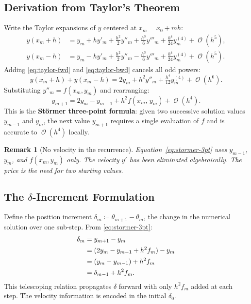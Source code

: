 \documentclass[11pt]{article}
\newtheorem{remark}{Remark}
\DeclareMathOperator{\OO}{\mathcal{O}}
\begin{document}
\subsection{Derivation from Taylor's Theorem}

Write the Taylor expansions of $y$ centered at $x_m = x_0 + mh$:
\begin{align}
  y(x_m + h) &= y_m + h y'_m + \tfrac{h^2}{2} y''_m
                + \tfrac{h^3}{6} y'''_m
                + \tfrac{h^4}{24} y^{(4)}_m + \OO(h^5), \label{eq:taylor-fwd}\\
  y(x_m - h) &= y_m - h y'_m + \tfrac{h^2}{2} y''_m
                - \tfrac{h^3}{6} y'''_m
                + \tfrac{h^4}{24} y^{(4)}_m + \OO(h^5). \label{eq:taylor-bwd}
\end{align}
Adding \eqref{eq:taylor-fwd} and \eqref{eq:taylor-bwd} cancels all odd powers:
\begin{equation}
  y(x_m + h) + y(x_m - h) = 2y_m + h^2 y''_m + \tfrac{h^4}{12} y^{(4)}_m + \OO(h^6).
\end{equation}
Substituting $y''_m = f(x_m, y_m)$ and rearranging:
\begin{equation}
  \label{eq:stormer-3pt}
  \boxed{y_{m+1} = 2y_m - y_{m-1} + h^2 f(x_m,\, y_m) + \OO(h^4).}
\end{equation}
This is the \textbf{Störmer three-point formula}: given two successive solution
values $y_{m-1}$ and $y_m$, the next value $y_{m+1}$ requires a single evaluation
of $f$ and is accurate to $\OO(h^4)$ locally.

\begin{remark}[No velocity in the recurrence]
  Equation~\eqref{eq:stormer-3pt} uses $y_{m-1}$, $y_m$, and $f(x_m, y_m)$ only.
  The velocity $y'$ has been eliminated algebraically.  The price is the need for
  two starting values.
\end{remark}

\subsection{The \texorpdfstring{$\delta$}{delta}-Increment Formulation}

Define the position increment $\delta_m \coloneqq \theta_{m+1} - \theta_m$, the change in the numerical solution over one sub-step.  From
\eqref{eq:stormer-3pt}:
\begin{align}
  \delta_m &= y_{m+1} - y_m \notag \\
           &= (2y_m - y_{m-1} + h^2 f_m) - y_m \notag \\
           &= (y_m - y_{m-1}) + h^2 f_m \notag \\
           &= \delta_{m-1} + h^2 f_m. \label{eq:delta-recurrence}
\end{align}
This telescoping relation propagates $\delta$ forward with only $h^2 f_m$ added at
each step.  The velocity information is encoded in the initial $\delta_0$.
\end{document}
